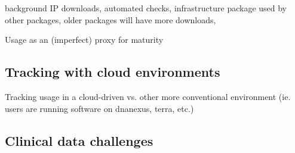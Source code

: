 \documentclass{article}
\begin{document}
background IP downloads, automated checks, infrastructure package used by other packages, older packages will have more downloads, 



Usage as an (imperfect) proxy for maturity

\subsection{Tracking with cloud environments}
Tracking usage in a cloud-driven vs. other more conventional environment (ie. users are running software on dnanexus, terra, etc.)



\subsection{Clinical data challenges}
\end{document}
